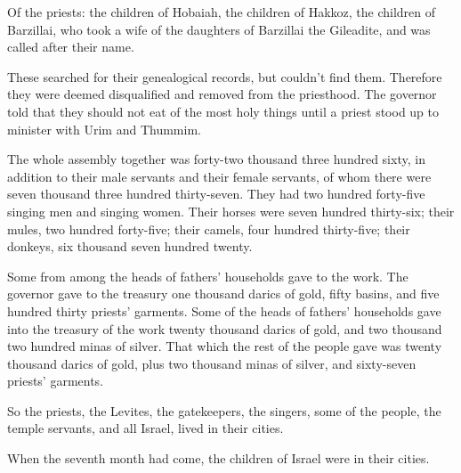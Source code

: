{\par }{\LI {}Of the priests: the children of Hobaiah, the children of Hakkoz, the children of Barzillai, who took a wife of the daughters of Barzillai the Gileadite, and was called after their name.
\par }{\PP {}These searched for their genealogical records, but couldn’t find them. Therefore they were deemed disqualified and removed from the priesthood.
The governor told that they should not eat of the most holy things until a priest stood up to minister with Urim and Thummim.
\par }{\PP {}The whole assembly together was forty-two thousand three hundred sixty,
in addition to their male servants and their female servants, of whom there were seven thousand three hundred thirty-seven. They had two hundred forty-five singing men and singing women.
Their horses were seven hundred thirty-six; their mules, two hundred forty-five;
their camels, four hundred thirty-five; their donkeys, six thousand seven hundred twenty.
\par }{\PP {}Some from among the heads of fathers’ households gave to the work. The governor gave to the treasury one thousand darics of gold, fifty basins, and five hundred thirty priests’ garments.
Some of the heads of fathers’ households gave into the treasury of the work twenty thousand darics of gold, and two thousand two hundred minas of silver.
That which the rest of the people gave was twenty thousand darics of gold, plus two thousand minas of silver, and sixty-seven priests’ garments.
\par }{\PP {}So the priests, the Levites, the gatekeepers, the singers, some of the people, the temple servants, and all Israel, lived in their cities.
\par }{\PP When the seventh month had come, the children of Israel were in their cities.

}
